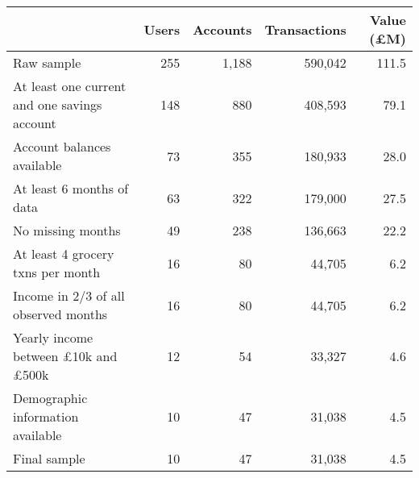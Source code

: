 \begin{tabular}{lrrrr}
\toprule
                                                 & Users & Accounts & Transactions & Value (\pounds M) \\
\midrule
                                      Raw sample &   255 &    1,188 &      590,042 &             111.5 \\
    At least one current and one savings account &   148 &      880 &      408,593 &              79.1 \\
                      Account balances available &    73 &      355 &      180,933 &              28.0 \\
                       At least 6 months of data &    63 &      322 &      179,000 &              27.5 \\
                               No missing months &    49 &      238 &      136,663 &              22.2 \\
               At least 4 grocery txns per month &    16 &       80 &       44,705 &               6.2 \\
            Income in 2/3 of all observed months &    16 &       80 &       44,705 &               6.2 \\
Yearly income between \pounds10k and \pounds500k &    12 &       54 &       33,327 &               4.6 \\
               Demographic information available &    10 &       47 &       31,038 &               4.5 \\
                                    Final sample &    10 &       47 &       31,038 &               4.5 \\
\bottomrule
\end{tabular}

